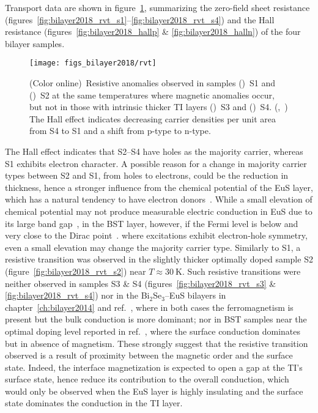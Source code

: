 Transport data are shown in figure~\ref{fig:bilayer2018_rvt}, summarizing the zero-field sheet resistance (figures~\ref{fig:bilayer2018_rvt_s1}--\ref{fig:bilayer2018_rvt_s4}) and the Hall resistance (figures~\ref{fig:bilayer2018_hallp} \& \ref{fig:bilayer2018_halln}) of the four bilayer samples. %
\begin{figure}[ht]%
    \centering%
    \texttt{[image: figs\_bilayer2018/rvt]}%
    \subfloat{\label{fig:bilayer2018_rvt_s1}}%
    \subfloat{\label{fig:bilayer2018_rvt_s2}}%
    \subfloat{\label{fig:bilayer2018_rvt_s3}}%
    \subfloat{\label{fig:bilayer2018_rvt_s4}}%
    \subfloat{\label{fig:bilayer2018_hallp}}%
    \subfloat{\label{fig:bilayer2018_halln}}%
    \caption[Temperature dependence of resistance, and the Hall effect, in (Bi$_{x}$Sb$_{1-x}$)$_2$Te$_3$--EuS bilayers]{\label{fig:bilayer2018_rvt}(Color online)~Resistive anomalies observed in samples (\protect{})~S1 and (\protect{})~S2 at the same temperatures where magnetic anomalies occur, but not in those with intrinsic thicker TI layers (\protect{})~S3 and (\protect{})~S4. (\protect{},~\protect{}) The Hall effect indicates decreasing carrier densities per unit area from S4 to S1 and a shift from p-type to n-type.}%
\end{figure}%
The Hall effect indicates that S2--S4 have holes as the majority carrier, whereas S1 exhibits electron character. A possible reason for a change in majority carrier types between S2 and S1, from holes to electrons, could be the reduction in thickness, hence a stronger influence from the chemical potential of the EuS layer, which has a natural tendency to have electron donors~\cite{EuS_ntype}. While a small elevation of chemical potential may not produce measurable electric conduction in EuS due to its large band gap~\cite{EuS_band_th1, EuS_band_th2}, in the BST layer, however, if the Fermi level is below and very close to the Dirac point~\cite{ZhangJS2011}. where excitations exhibit electron-hole symmetry, even a small elevation may change the majority carrier type. Similarly to S1, a resistive transition was observed in the slightly thicker optimally doped sample S2 (figure~\ref{fig:bilayer2018_rvt_s2}) near $T\approx30~\mathrm{K}$. Such resistive transitions were neither observed in samples S3 \& S4 (figures~\ref{fig:bilayer2018_rvt_s3} \& \ref{fig:bilayer2018_rvt_s4}) nor in the Bi$_2$Se$_3$--EuS bilayers in chapter~\ref{ch:bilayer2014} and ref.~\cite{bilayer2014}, where in both cases the ferromagnetism is present but the bulk conduction is more dominant; nor in BST samples near the optimal doping level reported in ref.~\cite{ZhangJS2011}, where the surface conduction dominates but in absence of magnetism. These strongly suggest that the resistive transition observed is a result of proximity between the magnetic order and the surface state. Indeed, the interface magnetization is expected to open a gap at the TI's surface state, hence reduce its contribution to the overall conduction, which would only be observed when the EuS layer is highly insulating and the surface state dominates the conduction in the TI layer.

